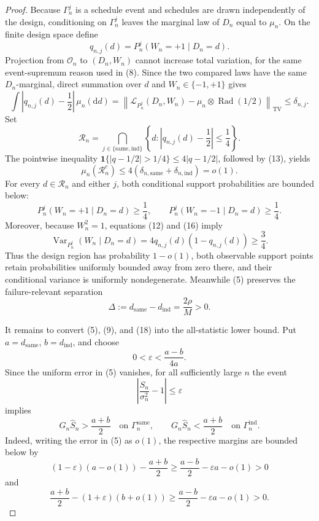 \documentclass{article}
\begin{document}
\begin{proof}
Because \(\Gamma_n^j\) is a schedule event and schedules are drawn independently of the design, conditioning on \(\Gamma_n^j\) leaves the marginal law of \(D_n\) equal to \(\mu_n\). On the finite design space define
\[
q_{n,j}(d)=P_n^j(W_n=+1\mid D_n=d).
\tag{12}
\]
Projection from \(\mathcal O_n\) to \((D_n,W_n)\) cannot increase total variation, for the same event-supremum reason used in (8). Since the two compared laws have the same \(D_n\)-marginal, direct summation over \(d\) and \(W_n\in\{-1,+1\}\) gives
\[
\int\left|q_{n,j}(d)-\frac12\right|\,\mu_n(\mathrm d d)
=\left\lVert
\mathcal L_{P_n^j}(D_n,W_n)-\mu_n\otimes\operatorname{Rad}(1/2)
\right\rVert_{\mathrm{TV}}
\le\delta_{n,j}.
\tag{13}
\]
Set
\[
\mathcal R_n=
\bigcap_{j\in\{\mathrm{same},\mathrm{ind}\}}
\left\{d:\left|q_{n,j}(d)-\frac12\right|\le\frac14\right\}.
\tag{14}
\]
The pointwise inequality
\(\mathbf 1\{|q-1/2|>1/4\}\le4|q-1/2|\), followed by (13), yields
\[
\mu_n(\mathcal R_n^c)
\le4(\delta_{n,\mathrm{same}}+\delta_{n,\mathrm{ind}})=o(1).
\tag{15}
\]
For every \(d\in\mathcal R_n\) and either \(j\), both conditional support probabilities are bounded below:
\[
P_n^j(W_n=+1\mid D_n=d)\ge\frac14,
\qquad
P_n^j(W_n=-1\mid D_n=d)\ge\frac14.
\tag{16}
\]
Moreover, because \(W_n^2=1\), equations (12) and (16) imply
\[
\operatorname{Var}_{P_n^j}(W_n\mid D_n=d)
=4q_{n,j}(d)(1-q_{n,j}(d))
\ge\frac34.
\tag{17}
\]
Thus the design region has probability \(1-o(1)\), both observable support points retain probabilities uniformly bounded away from zero there, and their conditional variance is uniformly nondegenerate. Meanwhile (5) preserves the failure-relevant separation
\[
\Delta:=d_{\mathrm{same}}-d_{\mathrm{ind}}=\frac{2\rho}{M}>0.
\tag{18}
\]

It remains to convert (5), (9), and (18) into the all-statistic lower bound. Put \(a=d_{\mathrm{same}}\), \(b=d_{\mathrm{ind}}\), and choose
\[
0<\varepsilon<\frac{a-b}{4a}.
\tag{19}
\]
Since the uniform error in (5) vanishes, for all sufficiently large \(n\) the event
\[
\left|\frac{\widehat S_n}{\sigma_n^2}-1\right|\le\varepsilon
\tag{20}
\]
implies
\[
G_n\widehat S_n>\frac{a+b}{2}
\quad\text{on }\Gamma_n^{\mathrm{same}},
\qquad
G_n\widehat S_n<\frac{a+b}{2}
\quad\text{on }\Gamma_n^{\mathrm{ind}}.
\tag{21}
\]
Indeed, writing the error in (5) as \(o(1)\), the respective margins are bounded below by
\[
(1-\varepsilon)(a-o(1))-\frac{a+b}{2}
\ge\frac{a-b}{2}-\varepsilon a-o(1)>0
\tag{22}
\]
and
\[
\frac{a+b}{2}-(1+\varepsilon)(b+o(1))
\ge\frac{a-b}{2}-\varepsilon a-o(1)>0.
\tag{23}
\]


\end{proof}
\end{document}
